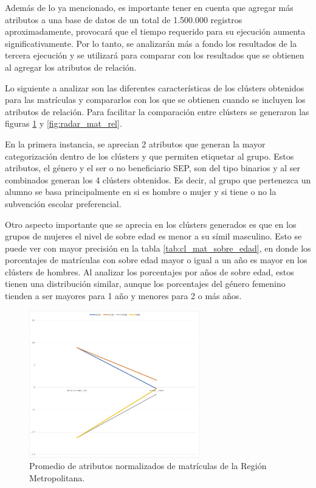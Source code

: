 Además de lo ya mencionado, es importante tener en cuenta que agregar más atributos a una base de datos de un total de 1.500.000 registros aproximadamente, provocará que el tiempo requerido para su ejecución aumenta significativamente. Por lo tanto, se analizarán más a fondo los resultados de la tercera ejecución y se utilizará para comparar con los resultados que se obtienen al agregar los atributos de relación.

Lo siguiente a analizar son las diferentes características de los clústers obtenidos para las matrículas y compararlos con los que se obtienen cuando se incluyen los atributos de relación. Para facilitar la comparación entre clústers se generaron las figuras \ref{fig:chart_mat} y \ref{fig:radar_mat_rel}.

En la primera instancia, se aprecian 2 atributos que generan la mayor categorización dentro de los clústers y que permiten etiquetar al grupo. Estos atributos, el género y el ser o no beneficiario SEP, son del tipo binarios y al ser combinados generan los 4 clústers obtenidos. Es decir, al grupo que pertenezca un alumno se basa principalmente en si es hombre o mujer y si tiene o no la subvención escolar preferencial.

Otro aspecto importante que se aprecia en los clústers generados es que en los grupos de mujeres el nivel de sobre edad es menor a su símil masculino. Esto se puede ver con mayor precisión en la tabla \ref{tab:cl_mat_sobre_edad}, en donde los porcentajes de matrículas con sobre edad mayor o igual a un año es mayor en los clústers de hombres. Al analizar los porcentajes por años de sobre edad, estos tienen una distribución similar, aunque los porcentajes del género femenino tienden a ser mayores para 1 año y menores para 2 o más años.

\begin{figure}[hc]
    \centering
    \includegraphics[width=0.66\textwidth]{images/chart_matriculas_sin.jpg}
    \caption{Promedio de atributos normalizados de matrículas de la Región Metropolitana.}
    \label{fig:chart_mat}
\end{figure}

